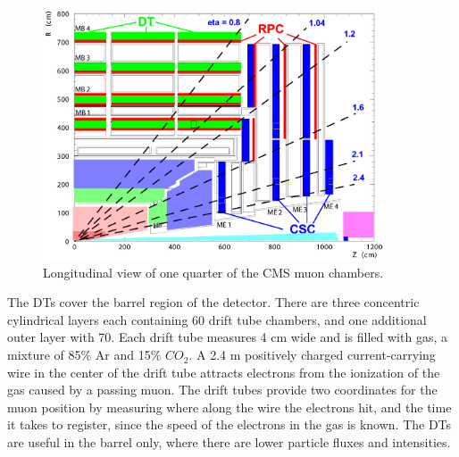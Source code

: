 \begin{figure}[hbtp]
 \begin{center}
   \includegraphics[width=0.9\textwidth]{ch3_figs/cms_muonchamber.pdf}
   \caption{Longitudinal view of one quarter of the CMS muon chambers.}
   \label{fig:cms_muonchamber}
 \end{center}
\end{figure}

The DTs cover the barrel region of the detector. There are three concentric cylindrical layers each containing 60 drift tube chambers, and one additional outer layer with 70.
Each drift tube measures 4 cm wide and is filled with gas, a mixture of 85$\%$ Ar and 15$\%$ $CO_{2}$. A 2.4 m positively charged current-carrying wire in the center of the drift tube attracts electrons from the ionization of the gas caused by a passing muon. The drift tubes provide two coordinates for the muon position by measuring where along the wire the
electrons hit, and the time it takes to register, since the speed of the electrons in the gas is known. The DTs are useful in the barrel only, where there are lower particle fluxes
and intensities. 

